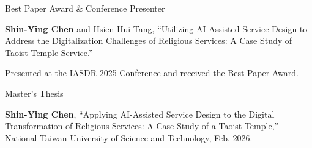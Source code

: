 

\begin{cventries}

\cvpub
    {Best Paper Award \& Conference Presenter}
    {
      \vspace{-1.5mm}
      \begin{cvitems}
        \item {\textbf{Shin-Ying Chen} and Hsien-Hui Tang, ``Utilizing AI-Assisted Service Design to Address the Digitalization Challenges of Religious Services: A Case Study of Taoist Temple Service.''}
        \item {Presented at the IASDR 2025 Conference and received the Best Paper Award.}
      \end{cvitems}
    }


\cvpub
    {Master's Thesis}
    {
      \vspace{-1.5mm}
      \begin{cvitems}
        \item {\textbf{Shin-Ying Chen}, ``Applying AI-Assisted Service Design to the Digital Transformation of Religious Services: A Case Study of a Taoist Temple,'' National Taiwan University of Science and Technology, Feb. 2026.}
      \end{cvitems}
    }
\end{cventries}
